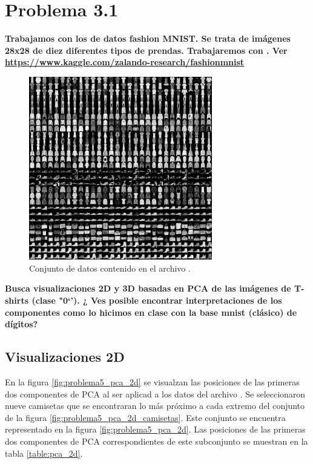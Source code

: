 \section*{Problema 3.1}

\textbf{Trabajamos con los de datos fashion MNIST. Se trata de imágenes 28x28 de diez diferentes tipos de prendas. Trabajaremos con .  Ver \url{https://www.kaggle.com/zalando-research/fashionmnist}}

\begin{figure}[H]
    \centering
    \includegraphics[width=8cm]{Graphics/Problema_3_1.png}
    \caption{Conjunto de datos contenido en el archivo .}
\end{figure}

\textbf{Busca visualizaciones 2D y 3D basadas en PCA de las imágenes de T-shirts (clase "0`'). ¿ Ves posible encontrar interpretaciones de los componentes como lo hicimos en clase con la base mnist (clásico) de dígitos?}


\subsection*{Visualizaciones 2D}

En la figura \ref{fig:problema5_pca_2d} se visualzan las posiciones de las primeras dos componentes de PCA al ser aplicad a los datos del archivo .
Se seleccionaron nueve camisetas que se encontraran lo más próximo a cada extremo del conjunto de la figura \ref{fig:problema5_pca_2d_camisetas}. Este conjunto se encuentra representado en la figura \ref{fig:problema5_pca_2d}. Las posiciones de las primeras dos componentes de PCA correspondientes de este subconjunto se muestran en la tabla \ref{table:pca_2d}.

